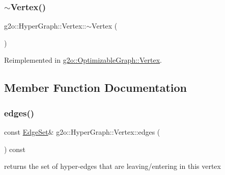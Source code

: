 \subsubsection{\texorpdfstring{$\sim$\+Vertex()}{~Vertex()}}
{\footnotesize\ttfamily g2o\+::\+Hyper\+Graph\+::\+Vertex\+::$\sim$\+Vertex (\begin{DoxyParamCaption}{ }\end{DoxyParamCaption})\hspace{0.3cm}{\ttfamily [virtual]}}



Reimplemented in \mbox{\hyperlink{classg2o_1_1_optimizable_graph_1_1_vertex_ac2208bfef95bba9670f13933d68fb929}{g2o\+::\+Optimizable\+Graph\+::\+Vertex}}.



\subsection{Member Function Documentation}
\mbox{\label{classg2o_1_1_hyper_graph_1_1_vertex_a3794ff3310c1dc05619bf0b77eaa4caa}} 
\subsubsection{\texorpdfstring{edges()}{edges()}\hspace{0.1cm}{\footnotesize\ttfamily [1/2]}}
{\footnotesize\ttfamily const \mbox{\hyperlink{classg2o_1_1_hyper_graph_a5e2970e236c0dcb4eff7c205d7b6b4ae}{Edge\+Set}}\& g2o\+::\+Hyper\+Graph\+::\+Vertex\+::edges (\begin{DoxyParamCaption}{ }\end{DoxyParamCaption}) const\hspace{0.3cm}{\ttfamily [inline]}}



returns the set of hyper-\/edges that are leaving/entering in this vertex 

\mbox{\label{classg2o_1_1_hyper_graph_1_1_vertex_a35cbf4ea796797bb5d9c35a41454e8fb}} 
